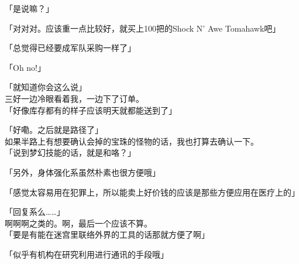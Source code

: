 「是说嘛？」

「对对对。应该重一点比较好，就买上100把的Shock N' Awe Tomahawk吧」

「总觉得已经要成军队采购一样了」

「Oh no!」

「就知道你会这么说」\\

三好一边冷眼看着我，一边下了订单。\\

「好像库存都有的样子应该明天就都能送到了」

「好嘞。之后就是路径了」\\

如果半路上有想要确认会掉的宝珠的怪物的话，我也打算去确认一下。\\

「说到梦幻技能的话，就是和咯？」

「另外，身体强化系虽然朴素也很方便哦」

「感觉太容易用在犯罪上，所以能卖上好价钱的应该是那些方便应用在医疗上的」

「回复系么……」\\

啊啊啊之类的。啊，最后一个应该不算。\\

「要是有能在迷宫里联络外界的工具的话那就方便了啊」

「似乎有机构在研究利用进行通讯的手段哦」

